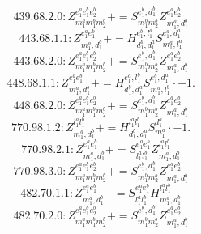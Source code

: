 \documentclass[letterpaper,10pt,fleqn,leqno,onecolumn]{article}
\begin{document}
\begin{equation} \;\;\;\;\;\;  439.68.2.0: Z^{e_{1}^{a}e_{1}^{b}e_{2}^{b}}_{m_{1}^{a}m_{1}^{b}m_{2}^{b}}+=S^{e_{1}^{b},d_{1}^{b}}_{m_{1}^{b}m_{2}^{b}}Z^{e_{1}^{a}e_{2}^{b}}_{m_{1}^{a},d_{1}^{b}} \end{equation}
\begin{equation} \;\;\;\;\;\;  443.68.1.1: Z^{e_{1}^{a}e_{1}^{b}}_{m_{1}^{a},d_{1}^{b}}+=H^{e_{1}^{b},l_{1}^{a}}_{d_{1}^{b},d_{1}^{a}}S^{e_{1}^{a},d_{1}^{a}}_{m_{1}^{a},l_{1}^{a}} \end{equation}
\begin{equation} \;\;\;\;\;\;  443.68.2.0: Z^{e_{1}^{a}e_{1}^{b}e_{2}^{b}}_{m_{1}^{a}m_{1}^{b}m_{2}^{b}}+=S^{e_{1}^{b},d_{1}^{b}}_{m_{1}^{b}m_{2}^{b}}Z^{e_{1}^{a}e_{2}^{b}}_{m_{1}^{a},d_{1}^{b}} \end{equation}
\begin{equation} \;\;\;\;\;\;  448.68.1.1: Z^{e_{1}^{a}e_{1}^{b}}_{m_{1}^{a},d_{1}^{b}}+=H^{e_{1}^{a},l_{1}^{b}}_{d_{1}^{b},d_{1}^{a}}S^{e_{1}^{b},d_{1}^{a}}_{m_{1}^{a},l_{1}^{b}}\cdot -1. \end{equation}
\begin{equation} \;\;\;\;\;\;  448.68.2.0: Z^{e_{1}^{a}e_{1}^{b}e_{2}^{b}}_{m_{1}^{a}m_{1}^{b}m_{2}^{b}}+=S^{e_{1}^{b},d_{1}^{b}}_{m_{1}^{b}m_{2}^{b}}Z^{e_{1}^{a}e_{2}^{b}}_{m_{1}^{a},d_{1}^{b}} \end{equation}
\begin{equation} \;\;\;\;\;\;  770.98.1.2: Z^{l_{1}^{a}l_{1}^{b}}_{m_{1}^{a},d_{1}^{b}}+=H^{l_{1}^{a}l_{1}^{b}}_{d_{1}^{b},d_{1}^{a}}S^{d_{1}^{a}}_{m_{1}^{a}}\cdot -1. \end{equation}
\begin{equation} \;\;\;\;\;\;  770.98.2.1: Z^{e_{1}^{a}e_{1}^{b}}_{m_{1}^{a},d_{1}^{b}}+=S^{e_{1}^{a}e_{1}^{b}}_{l_{1}^{a}l_{1}^{b}}Z^{l_{1}^{a}l_{1}^{b}}_{m_{1}^{a},d_{1}^{b}} \end{equation}
\begin{equation} \;\;\;\;\;\;  770.98.3.0: Z^{e_{1}^{a}e_{1}^{b}e_{2}^{b}}_{m_{1}^{a}m_{1}^{b}m_{2}^{b}}+=S^{e_{1}^{b},d_{1}^{b}}_{m_{1}^{b}m_{2}^{b}}Z^{e_{1}^{a}e_{2}^{b}}_{m_{1}^{a},d_{1}^{b}} \end{equation}
\begin{equation} \;\;\;\;\;\;  482.70.1.1: Z^{e_{1}^{a}e_{1}^{b}}_{m_{1}^{a},d_{1}^{b}}+=S^{e_{1}^{a}e_{1}^{b}}_{l_{1}^{a}l_{1}^{b}}H^{l_{1}^{a}l_{1}^{b}}_{m_{1}^{a},d_{1}^{b}} \end{equation}
\begin{equation} \;\;\;\;\;\;  482.70.2.0: Z^{e_{1}^{a}e_{1}^{b}e_{2}^{b}}_{m_{1}^{a}m_{1}^{b}m_{2}^{b}}+=S^{e_{1}^{b},d_{1}^{b}}_{m_{1}^{b}m_{2}^{b}}Z^{e_{1}^{a}e_{2}^{b}}_{m_{1}^{a},d_{1}^{b}} \end{equation}
\end{document}
